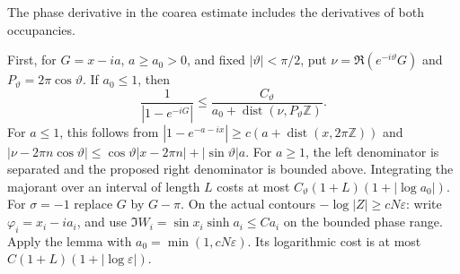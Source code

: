 \documentclass[11pt]{article}
\numberwithin{equation}{section}
\theoremstyle{definition}
\newcommand{\eps}{\varepsilon}
\begin{document}
The phase derivative in the coarea estimate includes the derivatives
of both occupancies.

First, for $G=x-ia$, $a\ge a_0>0$, and fixed
$|\vartheta|<\pi/2$, put $\nu=\Re(e^{-i\vartheta}G)$ and
$P_\vartheta=2\pi\cos\vartheta$.  If $a_0\le1$, then
\begin{equation}\label{eq:iso-oblique-kernel}
 \frac1{|1-e^{-iG}|}
 \le\frac{C_\vartheta}
 {a_0+\operatorname{dist}(\nu,P_\vartheta\mathbb Z)}.
\end{equation}
For $a\le1$, this follows from
$|1-e^{-a-ix}|\ge c(a+\operatorname{dist}(x,2\pi\mathbb Z))$
and
$|\nu-2\pi n\cos\vartheta|\le
 \cos\vartheta|x-2\pi n|+|\sin\vartheta|a$.
For $a\ge1$, the left denominator is separated and the proposed
right denominator is bounded above.  Integrating the majorant over
an interval of length $L$ costs at most
$C_\vartheta(1+L)(1+|\log a_0|)$.  For $\sigma=-1$ replace $G$
by $G-\pi$.  On the actual contours $-\log|Z|\ge cN\eps$:
write $\varphi_i=x_i-ia_i$, and use
$\Im W_i=\sin x_i\sinh a_i\le Ca_i$ on the bounded phase range.
Apply the lemma with $a_0=\min(1,cN\eps)$.  Its logarithmic cost is
at most $C(1+L)(1+|\log\eps|)$.
\end{document}

